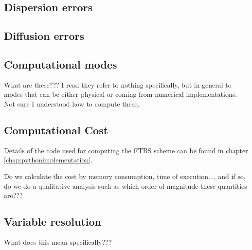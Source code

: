 \subsection{Dispersion errors}

\subsection{Diffusion errors}

\subsection{Computational modes}
What are these??? I read they refer to nothing specifically, but in general to modes that can be either physical or coming from numerical implementations. Not sure I understood how to compute these.

\subsection{Computational Cost}
Details of the code used for computing the FTBS scheme can be found in chapter \ref{chap:pythonimplementation}.

Do we calculate the cost by memory consumption, time of execution..., and if so, do we do a qualitative analysis such as which order of magnitude these quantities are???

\subsection{Variable resolution}
What does this mean specifically???
